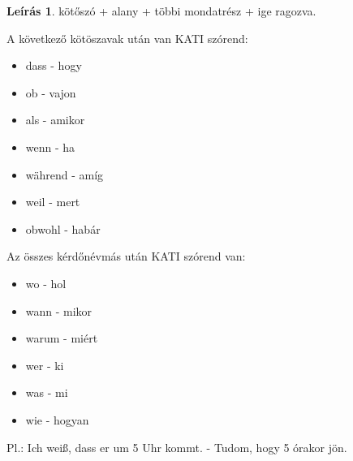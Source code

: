 \documentclass{article}
\theoremstyle{definition}
\newtheorem*{desc}{Leírás}
\begin{document}
\begin{desc}
kötőszó + alany + többi mondatrész + ige ragozva.

A következő kötöszavak után van KATI szórend:
\begin{itemize}
\item dass - hogy
\item ob - vajon
\item als - amikor
\item wenn - ha
\item während - amíg
\item weil - mert
\item obwohl - habár
\end{itemize}

Az összes kérdőnévmás után KATI szórend van:
\begin{itemize}
\item wo - hol
\item wann - mikor
\item warum - miért
\item wer - ki
\item was - mi
\item wie - hogyan
\end{itemize}

Pl.: Ich weiß, dass er um 5 Uhr kommt. - Tudom, hogy 5 órakor jön.
\end{desc}
\end{document}
